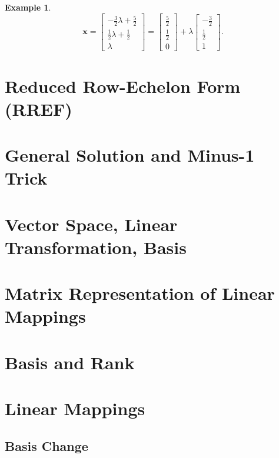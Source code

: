 \documentclass[12pt,openany]{book}
\theoremstyle{definition}
\newtheorem{example}{Example}[chapter]
\begin{document}
\begin{example}
\[		\textbf{x}=\begin{bmatrix}
			-\frac{3}{2}\lambda+\frac{5}{2}\\ \frac{1}{2}\lambda+\frac{1}{2}\\ \lambda
		\end{bmatrix}=\begin{bmatrix}
		\frac{5}{2}\\ \frac{1}{2}\\ 0
		\end{bmatrix}+\lambda\begin{bmatrix}
			-\frac{3}{2}\\ \frac{1}{2}\\ 1
		\end{bmatrix}.
		\]
	\end{example}

	\section{Reduced Row-Echelon Form (RREF)}
	\section{General Solution and Minus-1 Trick}
	
	\section{Vector Space, Linear Transformation, Basis}
	
	\newpage
	\section{Matrix Representation of Linear Mappings}
	
	\section{Basis and Rank}
	\section{Linear Mappings}
	\newpage
	\subsection{Basis Change}
	
\end{document}
